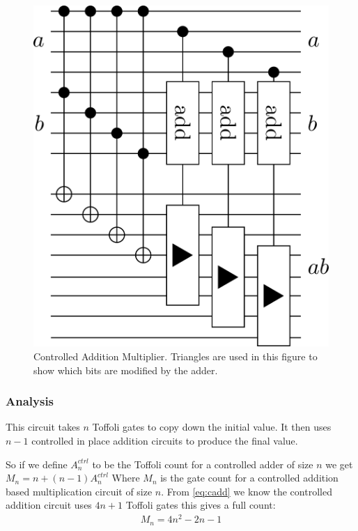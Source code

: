     \begin{figure}[ht]
      \capstart
      \centering
      \includegraphics[scale=0.25]{images/multCtrlAdd}
      \caption{Controlled Addition Multiplier. Triangles are used in this figure to show which bits are modified by the adder.}
      \label{fig:multAdd}
    \end{figure}
    \subsubsection{Analysis}
      This circuit takes $n$ Toffoli gates to copy down the initial value.
      It then uses $n-1$ controlled in place addition circuits to produce the final value.

      So if we define $A^{ctrl}_n$ to be the Toffoli count for a controlled adder of size $n$ we get $M_n = n + (n-1)A^{ctrl}_n$
      Where $M_n$ is the gate count for a controlled addition based multiplication circuit of size $n$.
      From \eqref{eq:cadd} we know the controlled addition circuit uses $4n+1$ Toffoli gates this gives a full count:
      \begin{align} \label{eq:caddtoff}
        M_n = 4n^2 - 2n -1
      \end{align}


